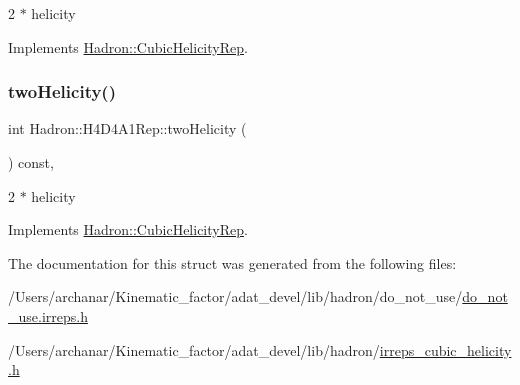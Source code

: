 2 $\ast$ helicity 

Implements \mbox{\hyperlink{structHadron_1_1CubicHelicityRep_af507aa56fc2747eacc8cb6c96db31ecc}{Hadron\+::\+Cubic\+Helicity\+Rep}}.

\mbox{\label{structHadron_1_1H4D4A1Rep_a67669ae49658ab0d57fd52e138c9dd40}} 
\subsubsection{\texorpdfstring{twoHelicity()}{twoHelicity()}\hspace{0.1cm}{\footnotesize\ttfamily [2/2]}}
{\footnotesize\ttfamily int Hadron\+::\+H4\+D4\+A1\+Rep\+::two\+Helicity (\begin{DoxyParamCaption}{ }\end{DoxyParamCaption}) const\hspace{0.3cm}{\ttfamily [inline]}, {\ttfamily [virtual]}}

2 $\ast$ helicity 

Implements \mbox{\hyperlink{structHadron_1_1CubicHelicityRep_af507aa56fc2747eacc8cb6c96db31ecc}{Hadron\+::\+Cubic\+Helicity\+Rep}}.



The documentation for this struct was generated from the following files\+:\begin{DoxyCompactItemize}
\item 
/\+Users/archanar/\+Kinematic\+\_\+factor/adat\+\_\+devel/lib/hadron/do\+\_\+not\+\_\+use/\mbox{\hyperlink{do__not__use_8irreps_8h}{do\+\_\+not\+\_\+use.\+irreps.\+h}}\item 
/\+Users/archanar/\+Kinematic\+\_\+factor/adat\+\_\+devel/lib/hadron/\mbox{\hyperlink{lib_2hadron_2irreps__cubic__helicity_8h}{irreps\+\_\+cubic\+\_\+helicity.\+h}}\end{DoxyCompactItemize}
